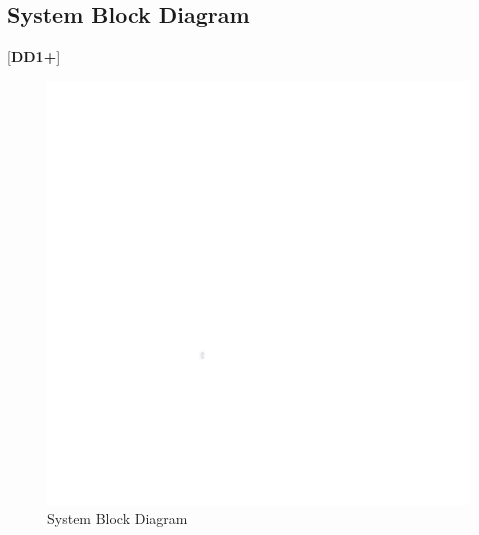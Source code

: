\documentclass[letterpaper, 11pt]{article}
\begin{document}
\subsection{System Block Diagram}
[\textbf{DD1+}]
\begin{figure}[h]
    \centering
    \includegraphics[width=16cm]{white.png} %
    \caption{System Block Diagram}
\end{figure}

\clearpage
\end{document}
